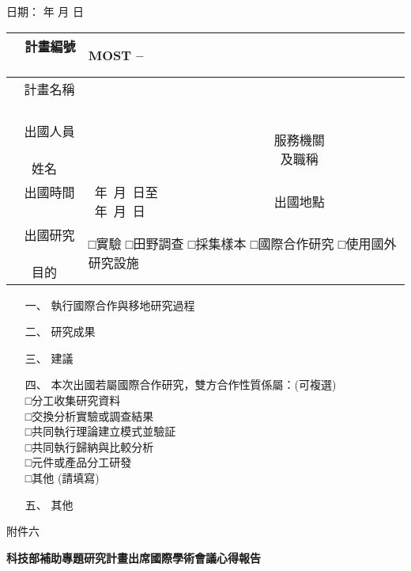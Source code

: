\documentclass[12pt]{article}
\begin{document}
\hfill{\small 日期：   年   月   日 }
\begin{table}[h!]{\renewcommand{\arraystretch}{2}
    \begin{tabular}{|c|l|c|l|}
    \hline
   ~ 計畫編號 ~ & \multicolumn{3}{l|}{MOST  --} \\ \hline
   ~ 計畫名稱 ~ & \multicolumn{3}{l|}{} \\ \hline
    \makecell{~ 出國人員 ~\\ 姓名} & ~ \hspace*{5cm} & \makecell{~ 服務機關 ~\\及職稱} & ~ \hspace*{5cm} \\ \hline
   ~ 出國時間 ~ & \makecell[l]{~年~月~日至\\  ~年~月~日} & 出國地點 & ~ \\ \hline
    \makecell{~ 出國研究 ~\\目的} & \multicolumn{3}{l|}{□實驗 □田野調查 □採集樣本 □國際合作研究 □使用國外研究設施} \\ \hline
    \end{tabular}
}
\end{table}
\begin{enumerate}
\item[一、] 執行國際合作與移地研究過程 

\item[二、]研究成果 

\item[三、]建議 

\item[四、]本次出國若屬國際合作研究，雙方合作性質係屬：(可複選) \\
□分工收集研究資料 \\
□交換分析實驗或調查結果 \\
□共同執行理論建立模式並驗証 \\
□共同執行歸納與比較分析 \\
□元件或產品分工研發 \\
□其他 (請填寫) 

\item[五、]其他

\end{enumerate}

\newpage
\vspace*{-1cm}
\noindent 附件六
\begin{center}
{\bf \Large 科技部補助專題研究計畫出席國際學術會議心得報告}
\end{center}
\end{document}

